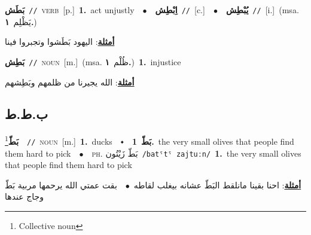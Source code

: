 \documentclass[10pt,a4paper,twoside]{article} %
\begin{document}
\begin{multicols}{2}
{\setlength\topsep{0pt}\textbf{\foreignlanguage{arabic}{بَطَش}}\ {\color{gray}\texttt{//}\color{black}}\ \textsc{verb}\ [p.]\ \textbf{1.}~act unjustly\ \ $\bullet$\ \ \setlength\topsep{0pt}\textbf{\foreignlanguage{arabic}{اِبْطِش}}\ {\color{gray}\texttt{//}\color{black}}\ [c.]\ \ $\bullet$\ \ \setlength\topsep{0pt}\textbf{\foreignlanguage{arabic}{يُبْطِش}}\ {\color{gray}\texttt{//}\color{black}}\ [i.]\ \color{gray}(msa. \foreignlanguage{arabic}{يَظْلِم}~\foreignlanguage{arabic}{\textbf{١.}})\color{black}\  \begin{flushright}\color{gray}\foreignlanguage{arabic}{\textbf{\underline{\foreignlanguage{arabic}{أمثلة}}}: اليهود بَطَشوا وتجبروا فينا}\end{flushright}\color{black}} \vspace{2mm}

{\setlength\topsep{0pt}\textbf{\foreignlanguage{arabic}{بَطِش}}\ {\color{gray}\texttt{//}\color{black}}\ \textsc{noun}\ [m.]\ \color{gray}(msa. \foreignlanguage{arabic}{ظُلْم}~\foreignlanguage{arabic}{\textbf{١.}})\color{black}\ \textbf{1.}~injustice\  \begin{flushright}\color{gray}\foreignlanguage{arabic}{\textbf{\underline{\foreignlanguage{arabic}{أمثلة}}}: الله يجيرنا من ظلمهم وبَطِشهم}\end{flushright}\color{black}} \vspace{2mm}

\vspace{-3mm}
\subsection*{\color{blue}\foreignlanguage{arabic}{ب.ط.ط}\color{blue}{}} 

{\setlength\topsep{0pt}\textbf{\foreignlanguage{arabic}{بَطّ}}\footnote{Collective noun}\ \ {\color{gray}\texttt{//}\color{black}}\ \textsc{noun}\ [m.]\ \textbf{1.}~ducks\ \ $\smblkdiamond$\ \ \setlength\topsep{0pt}\textbf{\foreignlanguage{arabic}{بَطّ}}\ \textbf{1.}~the very small olives that people find them hard to pick\ \ $\bullet$\ \ \textsc{ph.} \color{gray} \foreignlanguage{arabic}{بَطّ زَيْتُون}\color{black}\ {\color{gray}\texttt{/{\sffamily batˤtˤ zajtuːn}/}\color{black}}\ \textbf{1.}~the very small olives that people find them hard to pick\  \begin{flushright}\color{gray}\foreignlanguage{arabic}{\textbf{\underline{\foreignlanguage{arabic}{أمثلة}}}: احنا بقينا مانلقط البَطّ عشانه بيغلب لقاطه\ $\bullet$\ \  بقت عمتي الله يرحمها مربية بَطّ وجاج عندها}\end{flushright}\color{black}} \vspace{2mm}


\end{multicols}
\end{document}
